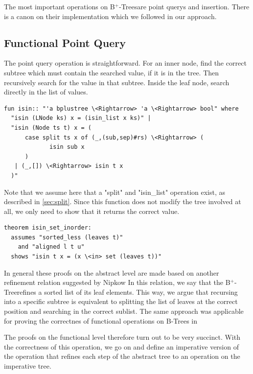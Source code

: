 \documentclass[a4paper,UKenglish,cleveref, autoref, thm-restate]{lipics-v2021}
\newcommand{\btree}{B$^+$-Tree}
\newcommand{\btrees}{B$^+$-Trees}
\begin{document}
The most important operations on \btrees are point querys and insertion.
There is a canon on their implementation which we followed in our approach.

\subsection{Functional Point Query}
\label{sec:functional_pq}

The point query operation is straightforward.
For an inner node, find the correct subtree which must contain
the searched value, if it is in the tree.
Then recursively search for the value in that subtree.
Inside the leaf node, search directly in the list of values.

\begin{lstlisting}[mathescape=true, language=Isabelle,label=lst:isin-def]
fun isin:: "'a bplustree \<Rightarrow> 'a \<Rightarrow> bool" where
  "isin (LNode ks) x = (isin_list x ks)" |
  "isin (Node ts t) x = (
      case split ts x of (_,(sub,sep)#rs) \<Rightarrow> (
             isin sub x
      )
   | (_,[]) \<Rightarrow> isin t x
  )"
\end{lstlisting}

Note that we assume here that a "split" and "isin\_list" operation exist,
as described in \autoref{sec:split}.
Since this function does not modify the tree involved at all,
we only need to show that it returns the correct value.

\begin{lstlisting}[mathescape=true, language=Isabelle,label=lst:isin-set-inorder]
theorem isin_set_inorder:
  assumes "sorted_less (leaves t)"
    and "aligned l t u"
  shows "isin t x = (x \<in> set (leaves t))"
\end{lstlisting}

In general these proofs on the abstract level are made
based on another refinement relation suggested by Nipkow %
In this relation, we say that the \btree refines a sorted list of its leaf elements.
This way, we argue that recursing into a specific subtree
is equivalent to splitting the list of leaves at the correct position
and searching in the correct sublist.
The same approach was applicable for proving the correctnes of functional
operations on B-Trees in %

The proofs on the functional level therefore turn out to be very succinct.
With the correctness of this operation,
we go on and define an imperative version of the operation that
refines each step of the abstract tree to an operation on the imperative tree.
\end{document}
